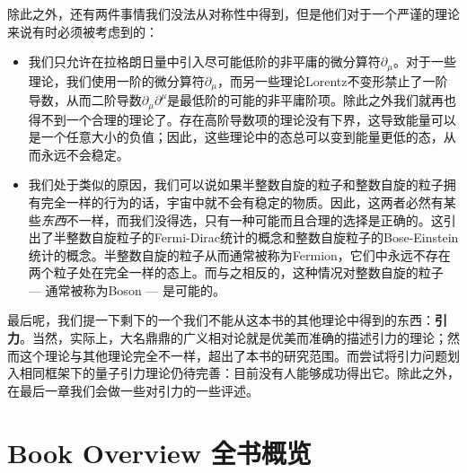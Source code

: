除此之外，还有两件事情我们没法从对称性中得到，但是他们对于一个严谨的理论来说有时必须被考虑到的：

\begin{itemize}
\item 我们只允许在拉格朗日量中引入尽可能低阶的非平庸的微分算符$\partial_\mu$。对于一些理论，我们使用一阶的微分算符$\partial_\mu$，而另一些理论Lorentz不变形禁止了一阶导数，从而二阶导数$\partial_\mu\partial^\mu$是最低阶的可能的非平庸阶项。除此之外我们就再也得不到一个合理的理论了。存在高阶导数项的理论没有下界，这导致能量可以是一个任意大小的负值；因此，这些理论中的态总可以变到能量更低的态，从而永远不会稳定。
\item 我们处于类似的原因，我们可以说如果半整数自旋的粒子和整数自旋的粒子拥有完全一样的行为的话，宇宙中就不会有稳定的物质。因此，这两者必然有某些{\it 东西}不一样，而我们没得选，只有一种可能而且合理的选择是正确的。这引出了半整数自旋粒子的Fermi-Dirac统计的概念和整数自旋粒子的Bose-Einstein统计的概念。半整数自旋的粒子从而通常被称为Fermion，它们中永远不存在两个粒子处在完全一样的态上。而与之相反的，这种情况对整数自旋的粒子 --- 通常被称为Boson --- 是可能的。
\end{itemize}

最后呢，我们提一下剩下的一个我们不能从这本书的其他理论中得到的东西：{\bf 引力}。当然，实际上，大名鼎鼎的广义相对论就是优美而准确的描述引力的理论；然而这个理论与其他理论完全不一样，超出了本书的研究范围。而尝试将引力问题划入相同框架下的量子引力理论仍待完善：目前没有人能够成功得出它。除此之外，在最后一章我们会做一些对引力的一些评述。

\section[全书概览]{Book Overview 全书概览}\label{sec1.2}

\begin{center}
\end{center}

